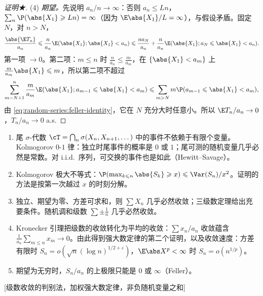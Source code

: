 \begin{proof}[证明★]
(4) \emph{期望。}先说明 $a_n/n\to\infty$：否则 $a_n\leqslant Ln$，$\sum_n\P(\abs{X_1}\geqslant Ln)=\infty$（因为 $\E\abs{X_1}/L=\infty$），与假设矛盾。固定 $N$，对 $n>N$，
\[
\frac{\abs{\E T_n}}{a_n}\leqslant\frac n{a_n}\E(\abs{X_1};\abs{X_1}<a_n)\leqslant\frac{na_N}{a_n}+\frac n{a_n}\E(\abs{X_1};a_N\leqslant\abs{X_1}<a_n).
\]
第一项 $\to0$。第二项：$m\leqslant n$ 时 $\frac n{a_n}\leqslant\frac m{a_m}$，在 $\{\abs{X_1}<a_m\}$ 上 $\frac m{a_m}\abs{X_1}\leqslant m$，所以第二项不超过
\[
\sum_{m=N+1}^n\frac m{a_m}\E(\abs{X_1};a_{m-1}\leqslant\abs{X_1}<a_m)\leqslant\sum_{m>N}m\P(a_{m-1}\leqslant\abs{X_1}<a_m),
\]
由 \eqref{eq:random-series:feller-identity}，它在 $N$ 充分大时任意小。所以 $\E T_n/a_n\to0$，$T_n/a_n\to0$ a.s.
\end{proof}


\begin{enumerate}
\item 尾 $\sigma$-代数 $\cT=\bigcap_n\sigma(X_n,X_{n+1},\dots)$ 中的事件不依赖于有限个变量。Kolmogorov $0$-$1$ 律：独立时尾事件的概率是 $0$ 或 $1$；尾可测的随机变量几乎必然是常数。对 i.i.d.\ 序列，可交换的事件也是如此（Hewitt--Savage）。
\item Kolmogorov 极大不等式：$\P(\max_{k\leqslant n}\abs{S_k}\geqslant x)\leqslant\Var(S_n)/x^2$。证明的方法是按第一次越过 $x$ 的时刻分解。
\item 独立、期望为零、方差可求和，则 $\sum X_n$ 几乎必然收敛；三级数定理给出充要条件。随机调和级数 $\sum\pm\frac1n$ 几乎必然收敛。
\item Kronecker 引理把级数的收敛转化为平均的收敛：$\sum x_n/a_n$ 收敛蕴含 $\frac1{a_n}\sum_{m\leqslant n}x_m\to0$。由此得到强大数定律的第二个证明，以及收敛速度：方差有限时 $S_n=o(\sqrt n(\log n)^{1/2+\varepsilon})$，$\E\abs X^p<\infty$ 时 $S_n=o(n^{1/p})$。
\item 期望为无穷时，$S_n/a_n$ 的上极限只能是 $0$ 或 $\infty$（Feller）。
\end{enumerate}

[级数收敛的判别法，加权强大数定律，非负随机变量之和]
\label{hw:random-series}


